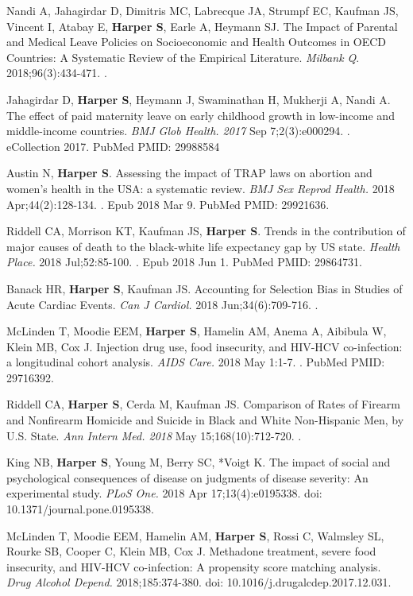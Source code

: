\documentclass[
  letterpaper,
  DIV=11,
  numbers=noendperiod]{scrartcl}
\begin{document}
Nandi A, Jahagirdar D, Dimitris MC, Labrecque JA, Strumpf EC, Kaufman
JS, Vincent I, Atabay E, \textbf{Harper S}, Earle A, Heymann SJ. The
Impact of Parental and Medical Leave Policies on Socioeconomic and
Health Outcomes in OECD Countries: A Systematic Review of the Empirical
Literature. \emph{Milbank Q}. 2018;96(3):434-471. .

Jahagirdar D, \textbf{Harper S}, Heymann J, Swaminathan H, Mukherji A,
Nandi A. The effect of paid maternity leave on early childhood growth in
low-income and middle-income countries. \emph{BMJ Glob Health. 2017} Sep
7;2(3):e000294. . eCollection 2017. PubMed PMID: 29988584

Austin N, \textbf{Harper S}. Assessing the impact of TRAP laws on
abortion and women's health in the USA: a systematic review. \emph{BMJ
Sex Reprod Health.} 2018 Apr;44(2):128-134. . Epub 2018 Mar 9. PubMed
PMID: 29921636.

Riddell CA, Morrison KT, Kaufman JS, \textbf{Harper S}. Trends in the
contribution of major causes of death to the black-white life expectancy
gap by US state. \emph{Health Place.} 2018 Jul;52:85-100. . Epub 2018
Jun 1. PubMed PMID: 29864731.

Banack HR, \textbf{Harper S}, Kaufman JS. Accounting for Selection Bias
in Studies of Acute Cardiac Events. \emph{Can J Cardiol.} 2018
Jun;34(6):709-716. .

McLinden T, Moodie EEM, \textbf{Harper S}, Hamelin AM, Anema A, Aibibula
W, Klein MB, Cox J. Injection drug use, food insecurity, and HIV-HCV
co-infection: a longitudinal cohort analysis. \emph{AIDS Care.} 2018 May
1:1-7. . PubMed PMID: 29716392.

Riddell CA, \textbf{Harper S}, Cerda M, Kaufman JS. Comparison of Rates
of Firearm and Nonfirearm Homicide and Suicide in Black and White
Non-Hispanic Men, by U.S. State. \emph{Ann Intern Med. 2018} May
15;168(10):712-720. .

King NB, \textbf{Harper S}, Young M, Berry SC, *Voigt K. The impact of
social and psychological consequences of disease on judgments of disease
severity: An experimental study. \emph{PLoS One.} 2018 Apr
17;13(4):e0195338. doi: 10.1371/journal.pone.0195338.

McLinden T, Moodie EEM, Hamelin AM, \textbf{Harper S}, Rossi C, Walmsley
SL, Rourke SB, Cooper C, Klein MB, Cox J. Methadone treatment, severe
food insecurity, and HIV-HCV co-infection: A propensity score matching
analysis. \emph{Drug Alcohol Depend.} 2018;185:374-380. doi:
10.1016/j.drugalcdep.2017.12.031.
\end{document}
